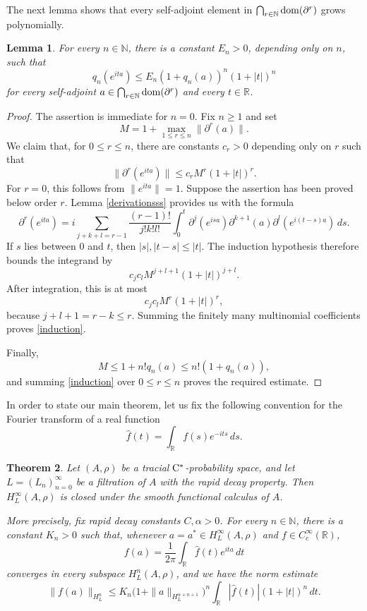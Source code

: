 \documentclass[11pt]{article}
\newtheorem{thm}{Theorem}[section]
\newtheorem{lem}[thm]{Lemma}
\theoremstyle{definition}
\theoremstyle{remark}
\numberwithin{equation}{section}
\numberwithin{equation}{section}
\numberwithin{equation}{section}
\begin{document}
The next lemma shows that every self-adjoint element in $\bigcap_{r\in\mathbb N}{\rm dom}(\partial^r)$ grows polynomially.

\begin{lem}\label{polgrowth}
For every $n\in\mathbb N$, there is a constant $E_n>0$, depending only on $n$, such that
\begin{equation*}
 q_n(e^{ita})
 \leq E_n(1+q_n(a))^n(1+|t|)^n
\end{equation*}
for every self-adjoint $a\in\bigcap_{r\in\mathbb N}{\rm dom}(\partial^r)$ and every $t\in\mathbb R$.
\end{lem}

\begin{proof}
The assertion is immediate for $n=0$.  Fix $n\geq1$ and set
\[
 M=1+\max_{1\leq r\leq n}\|\partial^r(a)\|.
\]
We claim that, for $0\leq r\leq n$, there are constants $c_r>0$ depending only on $r$ such that
\begin{equation}\label{induction}
 \|\partial^r(e^{ita})\|\leq c_rM^r(1+|t|)^r.
\end{equation}
For $r=0$, this follows from $\|e^{ita}\|=1$.  Suppose the assertion has been proved below order $r$. Lemma \ref{derivationsss} provides us with the formula
$$
\partial^r(e^{ita})=i\sum_{j+k+l=r-1}\frac{(r-1)!}{j!k!l!}\int_0^t\partial^j(e^{isa})\partial^{k+1}(a)\partial^l(e^{i(t-s)a})\,ds.
$$
If $s$ lies between $0$ and $t$, then $|s|,|t-s|\leq|t|$. The induction hypothesis therefore bounds the integrand by
\[
 c_jc_lM^{j+l+1}(1+|t|)^{j+l}.
\]
After integration, this is at most
\[
 c_jc_lM^r(1+|t|)^r,
\]
because $j+l+1=r-k\leq r$.  Summing the finitely many multinomial coefficients proves \eqref{induction}.

Finally,
\[
 M\leq1+n!q_n(a)\leq n!(1+q_n(a)),
\]
and summing \eqref{induction} over $0\leq r\leq n$ proves the required estimate.
\end{proof}


In order to state our main theorem, let us fix the following convention for the Fourier transform of a real function
\[
 \widehat f(t)=\int_{\mathbb R}f(s)e^{-its}\,ds.
\]


\begin{thm}\label{actual}
    Let $(A,\rho)$ be a tracial ${\rm C}^*$-probability space, and let
$L=(L_n)_{n=0}^\infty$ be a filtration of $A$ with the rapid decay property.
Then $H_L^\infty(A,\rho)$ is closed under the smooth functional calculus of
$A$.

More precisely, fix rapid decay constants $C,\alpha>0$.  For every
$n\in\mathbb N$, there is a constant $K_n>0$ such that, whenever
$a=a^*\in H_L^\infty(A,\rho)$ and $f\in C_c^\infty(\mathbb R)$,
\begin{equation*}
 f(a)=\frac{1}{2\pi}\int_{\mathbb R}\widehat f(t)e^{ita}\,dt
\end{equation*}
converges in every subspace $H_L^n(A,\rho)$, and we have the norm estimate
\begin{equation*}
 \|f(a)\|_{H_L^n}\leq K_n\bigl(1+\|a\|_{H_L^{\alpha+n+1}}\bigr)^n \int_{\mathbb R}|\widehat f(t)|(1+|t|)^n\,dt.
\end{equation*}
\end{thm}
\end{document}
